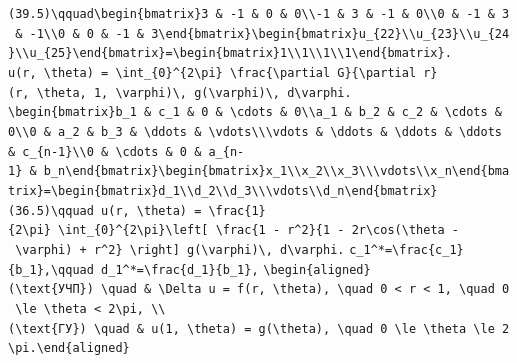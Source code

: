 \documentclass[
  ukrainian,
]{article}
\begin{document}
\texttt{(39.5)\textbackslash{}qquad\textbackslash{}begin\{bmatrix\}3\ \&\ -1\ \&\ 0\ \&\ 0\textbackslash{}\textbackslash{}-1\ \&\ 3\ \&\ -1\ \&\ 0\textbackslash{}\textbackslash{}0\ \&\ -1\ \&\ 3\ \&\ -1\textbackslash{}\textbackslash{}0\ \&\ 0\ \&\ -1\ \&\ 3\textbackslash{}end\{bmatrix\}\textbackslash{}begin\{bmatrix\}u\_\{22\}\textbackslash{}\textbackslash{}u\_\{23\}\textbackslash{}\textbackslash{}u\_\{24\}\textbackslash{}\textbackslash{}u\_\{25\}\textbackslash{}end\{bmatrix\}=\textbackslash{}begin\{bmatrix\}1\textbackslash{}\textbackslash{}1\textbackslash{}\textbackslash{}1\textbackslash{}\textbackslash{}1\textbackslash{}end\{bmatrix\}.}
\texttt{u(r,\ \textbackslash{}theta)\ =\ \textbackslash{}int\_\{0\}\^{}\{2\textbackslash{}pi\}\ \textbackslash{}frac\{\textbackslash{}partial\ G\}\{\textbackslash{}partial\ r\}(r,\ \textbackslash{}theta,\ 1,\ \textbackslash{}varphi)\textbackslash{},\ g(\textbackslash{}varphi)\textbackslash{},\ d\textbackslash{}varphi.}
\texttt{\textbackslash{}begin\{bmatrix\}b\_1\ \&\ c\_1\ \&\ 0\ \&\ \textbackslash{}cdots\ \&\ 0\textbackslash{}\textbackslash{}a\_1\ \&\ b\_2\ \&\ c\_2\ \&\ \textbackslash{}cdots\ \&\ 0\textbackslash{}\textbackslash{}0\ \&\ a\_2\ \&\ b\_3\ \&\ \textbackslash{}ddots\ \&\ \textbackslash{}vdots\textbackslash{}\textbackslash{}\textbackslash{}vdots\ \&\ \textbackslash{}ddots\ \&\ \textbackslash{}ddots\ \&\ \textbackslash{}ddots\ \&\ c\_\{n-1\}\textbackslash{}\textbackslash{}0\ \&\ \textbackslash{}cdots\ \&\ 0\ \&\ a\_\{n-1\}\ \&\ b\_n\textbackslash{}end\{bmatrix\}\textbackslash{}begin\{bmatrix\}x\_1\textbackslash{}\textbackslash{}x\_2\textbackslash{}\textbackslash{}x\_3\textbackslash{}\textbackslash{}\textbackslash{}vdots\textbackslash{}\textbackslash{}x\_n\textbackslash{}end\{bmatrix\}=\textbackslash{}begin\{bmatrix\}d\_1\textbackslash{}\textbackslash{}d\_2\textbackslash{}\textbackslash{}d\_3\textbackslash{}\textbackslash{}\textbackslash{}vdots\textbackslash{}\textbackslash{}d\_n\textbackslash{}end\{bmatrix\}}
\texttt{(36.5)\textbackslash{}qquad\ u(r,\ \textbackslash{}theta)\ =\ \textbackslash{}frac\{1\}\{2\textbackslash{}pi\}\ \textbackslash{}int\_\{0\}\^{}\{2\textbackslash{}pi\}\textbackslash{}left{[}\ \textbackslash{}frac\{1\ -\ r\^{}2\}\{1\ -\ 2r\textbackslash{}cos(\textbackslash{}theta\ -\ \textbackslash{}varphi)\ +\ r\^{}2\}\ \textbackslash{}right{]}\ g(\textbackslash{}varphi)\textbackslash{},\ d\textbackslash{}varphi.}
\texttt{c\_1\^{}*=\textbackslash{}frac\{c\_1\}\{b\_1\},\textbackslash{}qquad\ d\_1\^{}*=\textbackslash{}frac\{d\_1\}\{b\_1\},}
\texttt{\textbackslash{}begin\{aligned\}(\textbackslash{}text\{УЧП\})\ \textbackslash{}quad\ \&\ \textbackslash{}Delta\ u\ =\ f(r,\ \textbackslash{}theta),\ \textbackslash{}quad\ 0\ \textless{}\ r\ \textless{}\ 1,\ \textbackslash{}quad\ 0\ \textbackslash{}le\ \textbackslash{}theta\ \textless{}\ 2\textbackslash{}pi,\ \textbackslash{}\textbackslash{}(\textbackslash{}text\{ГУ\})\ \textbackslash{}quad\ \&\ u(1,\ \textbackslash{}theta)\ =\ g(\textbackslash{}theta),\ \textbackslash{}quad\ 0\ \textbackslash{}le\ \textbackslash{}theta\ \textbackslash{}le\ 2\textbackslash{}pi.\textbackslash{}end\{aligned\}}
\end{document}
